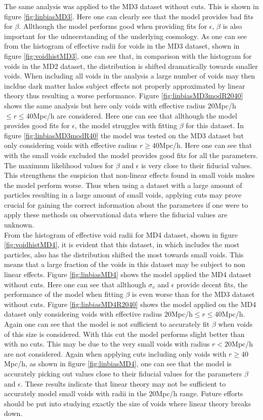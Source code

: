 The same analysis was applied to the MD3 dataset without cuts. This is shown in figure \ref{fig:linbiasMD3}. Here one can clearly see that the model provides bad fits for $\beta$. Allthough the model performs good when providing fits for $\epsilon$, $\beta$ is also important for the udneerstanding of the underlying cosmology. As one can see from the histogram of effective radii for voids in the MD3 dataset, shown in figure \ref{fig:voidhistMD3}, one can see that, in comparison with the histogram for voids in the MD2 dataset, the distribution is shifted dramatically towards smaller voids. When including all voids in the analysis a large number of voids may then incldue dark matter halos subject effects not properly approximated by linear theory thus resulting a worse performance. Figure \ref{fig:linbiasMD3modR2040} shows the same analysis but here only voids with effective radius $20$Mpc/h$\leq r\leq 40$Mpc/h are considered. Here one can see that allthough the model provides good fits for $\epsilon$, the model struggles with fitting $\beta$ for this dataset. In figure \ref{fig:linbiasMD3modR40} the model was tested on the MD3 dataset but only considering voids with effective radius $r\geq 40$Mpc/h. Here one can see that with the small voids excluded the model provides good fits for all the parameters. The maximum likelihood values for $\beta$ and $\epsilon$ is very close to their fiducial values. This strengthens the suspicion that non-linear effects found in small voids makes the model perform worse. Thus when using a dataset with a large amount of particles resulting in a large amount of small voids, applying cuts may prove crucial for gaining the correct information about the parameters if one were to apply these methods on observational data where the fiducial values are unknown. \\\indent
From the histogram of effective void radii for MD4 dataset, shown in figure \ref{fig:voidhistMD4}, it is evident that this dataset, in which includes the most particles, also has the distribution shifted the most towards small voids. This means that a large fraction of the voids in this dataset may be subject to non linear effects. Figure \ref{fig:linbiasMD4} shows the model applied the MD4 dataset without cuts. Here one can see that allthough $\sigma_v$ and $\epsilon$ provide decent fits, the performance of the model when fitting $\beta$ is even worse than for the MD3 dataset without cuts. Figure \ref{fig:linbiasMD4R2040} shows the model applied on the MD4 dataset only considering voids with effective radius $20$Mpc/h$\leq r\leq 40$Mpc/h. Again one can see that the model is not sufficient to accurately fit $\beta$ when voids of this size is considered. With this cut the model performs slight better than with no cuts. This may be due to the very small voids with radius $r< 20$Mpc/h are not considered. Again when applying cuts including only voids with $r\geq 40$Mpc/h, as shown in figure \ref{fig:linbiasMD4}, one can see that the model is accurately picking out values close to their fiducial values for the parameters $\beta$ and $\epsilon$. These results indicate that linear theory may not be sufficient to accurately model small voids with radii in the $20$Mpc/h range. Future efforts should be put into studying exactly the size of voids where linear theory breaks down.  

